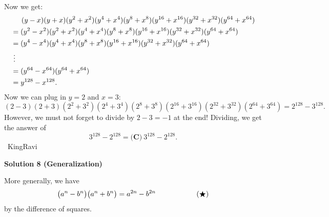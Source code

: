 \begin{enumerate}
 Now we get:
 \begin{align*} &\hspace{5.125mm}(y-x)(y+x)(y^2+x^2)(y^4+x^4)(y^8+x^8)(y^{16}+x^{16})(y^{32}+x^{32})(y^{64}+x^{64}) \\ &=(y^2-x^2)(y^2+x^2)(y^4+x^4)(y^8+x^8)(y^{16}+x^{16})(y^{32}+x^{32})(y^{64}+x^{64}) \\ &=(y^4-x^4)(y^4+x^4)(y^8+x^8)(y^{16}+x^{16})(y^{32}+x^{32})(y^{64}+x^{64}) \\ & \ \vdots \\ &=(y^{64}-x^{64})(y^{64}+x^{64}) \\ &=y^{128}-x^{128}. \end{align*}
Now we can plug in $y = 2$ and $x = 3:$ 
 \[(2-3)(2+3)(2^2+3^2)(2^4+3^4)(2^8+3^8)(2^{16}+3^{16})(2^{32}+3^{32})(2^{64}+3^{64}) = 2^{128}-3^{128}.\]However, we must not forget to divide by $2-3 = -1$ at the end! Dividing, we get the answer of 
 \[3^{128}-2^{128} = \boxed{\textbf{(C)} ~3^{128}-2^{128}}.\]~KingRavi

 



\textbf{Solution 8 (Generalization)}

More generally, we have 
 \[\bigl(a^n-b^n\bigr)\bigl(a^n+b^n\bigr)=a^{2n}-b^{2n}\hspace{20mm}(\bigstar)\] by the difference of squares.


\end{enumerate}
